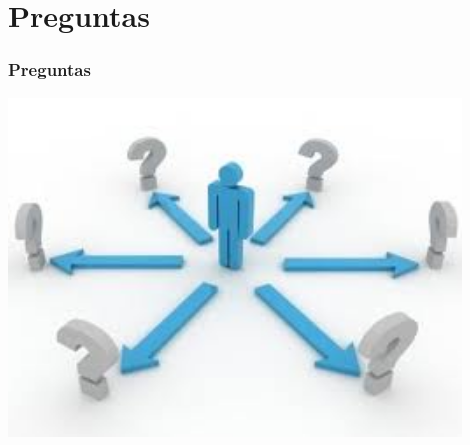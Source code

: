 \documentclass{beamer}
\begin{document}
% 		
% 		
	
\section{Preguntas}
	\begin{frame}
		\frametitle{Preguntas}
		\includegraphics[width = 0.9\textwidth]{preguntas.jpeg}
	\end{frame}
\end{document}
